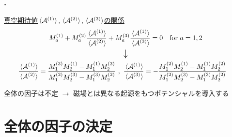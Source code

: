 \documentclass[aspectratio=169,
  a4paper,uplatex,dvipdfmx,11pt,
  xcolor = {dvipsnames,svgnames},
  hyperref ={colorlinks=true,citecolor=Navy,linkcolor=NavyBlue,urlcolor=purple}
]{beamer}
\begin{document}
\begin{frame}
  \frametitle{\thesection.\ \secname}

  \vspace*{-10pt}

  \uline{真空期待値$\ev*{\mathcal{A}^{(1)}},\ev*{\mathcal{A}^{(2)}},\ev*{\mathcal{A}^{(3)}}$の関係}
  \begin{gather}
    M_{a}^{(1)}
    +
    M_{a}^{(2)}
    \frac{\ev*{\mathcal{A}^{(1)}}}{\ev*{\mathcal{A}^{(2)}}}
    +
    M_{a}^{(3)}
    \frac{\ev*{\mathcal{A}^{(1)}}}{\ev*{\mathcal{A}^{(3)}}}
    =
    0
    \quad
    \text{for}
    \ 
    a=1,2
    \nonumber    
    \\
    \text{\Large $\downarrow$}
    \nonumber
    \\
    \hspace*{-10pt}
    \frac{\ev*{\mathcal{A}^{(1)}}}{\ev*{\mathcal{A}^{(2)}}}
    =
    \frac{
      M_{1}^{(3)} M_{2}^{(1)}-M_{1}^{(1)} M_{2}^{(3)}
    }{
      M_{1}^{(2)} M_{2}^{(3)}- M_{1}^{(3)} M_{2}^{(2)}
    }
    \ ,\ 
    \frac{\ev*{\mathcal{A}^{(1)}}}{\ev*{\mathcal{A}^{(3)}}}
    =
    -\frac{
      M_{1}^{(2)} M_{2}^{(1)}-M_{1}^{(1)} M_{2}^{(2)}
    }{
      M_{1}^{(2)} M_{2}^{(3)}-M_{1}^{(3)} M_{2}^{(2)}
    }
    \nonumber
  \end{gather}
  \begin{center}
  \end{center}
  \pause
  \begin{redbox}{\empty}
    \centering
    全体の因子は不定
    $\longrightarrow$
    磁場とは異なる起源をもつポテンシャルを導入する
  \end{redbox}
\end{frame}


\section{全体の因子の決定}
\end{document}

